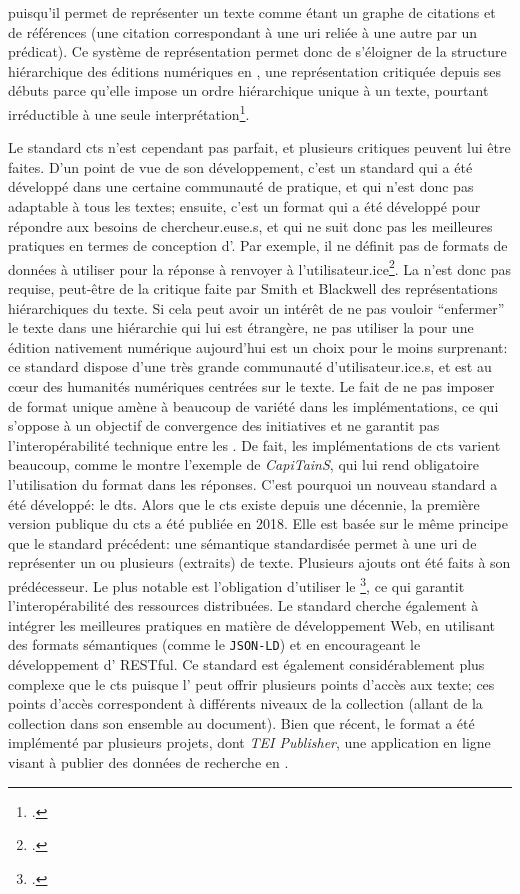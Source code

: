 puisqu'il permet de représenter un texte comme étant un graphe de citations et de références (une citation correspondant à une \gls{uri} reliée à une autre par un prédicat). Ce système de représentation permet donc de s'éloigner de la structure hiérarchique des éditions numériques en \tei{}, une représentation critiquée depuis ses débuts parce qu'elle impose un ordre hiérarchique unique à un texte, pourtant irréductible à une seule interprétation\footcite{renear_refining_1996}.

Le standard \gls{cts} n'est cependant pas parfait, et plusieurs critiques peuvent lui être faites. D'un point de vue de son développement, c'est un standard qui a été développé dans une certaine communauté de pratique, et qui n'est donc pas adaptable à tous les textes; ensuite, c'est un format qui a été développé pour répondre aux besoins de chercheur.euse.s, et qui ne suit donc pas les meilleures pratiques en termes de conception d'\api{}. Par exemple, il ne définit pas de formats de données à utiliser pour la réponse à renvoyer à l'utilisateur.ice\footcite[p. 2]{almas_distributed_2021}. La \tei{} n'est donc pas requise, peut-être de la critique faite par Smith et Blackwell des représentations hiérarchiques du texte. Si cela peut avoir un intérêt de ne pas vouloir \enquote{enfermer} le texte dans une hiérarchie qui lui est étrangère, ne pas utiliser la \tei{} pour une édition nativement numérique aujourd'hui est un choix pour le moins surprenant: ce standard dispose d'une très grande communauté d'utilisateur.ice.s, et est au cœur des humanités numériques centrées sur le texte. Le fait de ne pas imposer de format unique amène à beaucoup de variété dans les implémentations, ce qui s'oppose à un objectif de convergence des initiatives et ne garantit pas l'interopérabilité technique entre les \api{}. De fait, les implémentations de \gls{cts} varient beaucoup, comme le montre l'exemple de \textit{CapiTainS}, qui lui rend obligatoire l'utilisation du format \xml{} dans les réponses. C'est pourquoi un nouveau standard a été développé: le \gls{dts}. Alors que le \gls{cts} existe depuis une décennie, la première version publique du \gls{cts} a été publiée en 2018. Elle est basée sur le même principe que le standard précédent: une sémantique standardisée permet à une \gls{uri} de représenter un ou plusieurs (extraits) de texte. Plusieurs ajouts ont été faits à son prédécesseur. Le plus notable est l'obligation d'utiliser le \xmltei{}\footcite[p. 3]{almas_distributed_2021}, ce qui garantit l'interopérabilité des ressources distribuées. Le standard cherche également à intégrer les meilleures pratiques en matière de développement Web, en utilisant des formats sémantiques (comme le \texttt{JSON-LD}) et en encourageant le développement d'\api{} RESTful. Ce standard est également considérablement plus complexe que le \gls{cts} puisque l'\api{} peut offrir plusieurs points d'accès aux texte; ces points d'accès correspondent à différents niveaux de la collection (allant de la collection dans son ensemble au document). Bien que récent, le format a été implémenté par plusieurs projets, dont \textit{TEI Publisher}, une application en ligne visant à publier des données de recherche en \tei{}.

